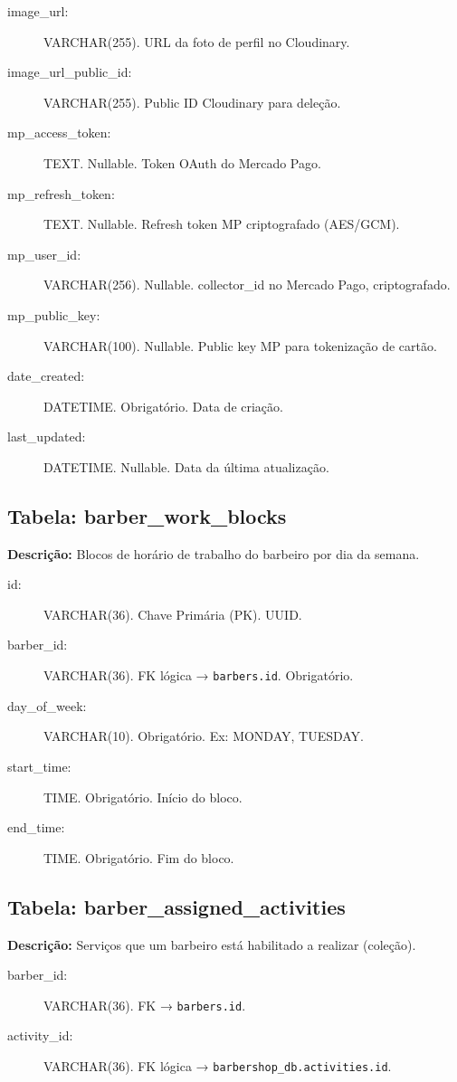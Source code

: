 \documentclass[
    12pt, 
    a4paper, 
    oneside, 
    chapter=TITLE, 
    section=TITLE
]{abntex2}
\begin{document}
\begin{apendicesenv}
\begin{description}
    \item[image\_url:] VARCHAR(255). URL da foto de perfil no Cloudinary.
    \item[image\_url\_public\_id:] VARCHAR(255). Public ID Cloudinary para deleção.
    \item[mp\_access\_token:] TEXT. Nullable. Token OAuth do Mercado Pago.
    \item[mp\_refresh\_token:] TEXT. Nullable. Refresh token MP criptografado (AES/GCM).
    \item[mp\_user\_id:] VARCHAR(256). Nullable. collector\_id no Mercado Pago, criptografado.
    \item[mp\_public\_key:] VARCHAR(100). Nullable. Public key MP para tokenização de cartão.
    \item[date\_created:] DATETIME. Obrigatório. Data de criação.
    \item[last\_updated:] DATETIME. Nullable. Data da última atualização.
\end{description}

\subsection*{Tabela: barber\_work\_blocks}
\textbf{Descrição:} Blocos de horário de trabalho do barbeiro por dia da semana.
\begin{description}
    \item[id:] VARCHAR(36). Chave Primária (PK). UUID.
    \item[barber\_id:] VARCHAR(36). FK lógica → \texttt{barbers.id}. Obrigatório.
    \item[day\_of\_week:] VARCHAR(10). Obrigatório. Ex: MONDAY, TUESDAY.
    \item[start\_time:] TIME. Obrigatório. Início do bloco.
    \item[end\_time:] TIME. Obrigatório. Fim do bloco.
\end{description}

\subsection*{Tabela: barber\_assigned\_activities}
\textbf{Descrição:} Serviços que um barbeiro está habilitado a realizar (coleção).
\begin{description}
    \item[barber\_id:] VARCHAR(36). FK → \texttt{barbers.id}.
    \item[activity\_id:] VARCHAR(36). FK lógica → \texttt{barbershop\_db.activities.id}.
\end{description}


\end{apendicesenv}
\end{document}
